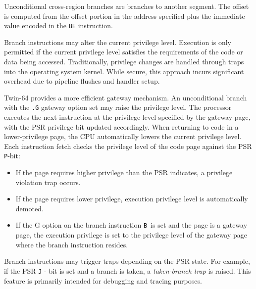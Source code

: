 
Unconditional cross-region branches are branches to another segment. The offset is computed from the offset portion in the address specified plus the immediate value encoded in the \texttt{BE} instruction.


Branch instructions may alter the current privilege level. Execution is only permitted if the current privilege level satisfies the requirements of the code or data being accessed. Traditionally, privilege changes are handled through traps into the operating system kernel. While secure, this approach incurs significant overhead due to pipeline flushes and handler setup.

Twin-64 provides a more efficient gateway mechanism. An unconditional branch with the \texttt{.G} gateway option set may raise the privilege level. The processor executes the next instruction at the privilege level specified by the gateway page, with the PSR privilege bit updated accordingly. When returning to code in a lower-privilege page, the CPU automatically lowers the current privilege level. Each instruction fetch checks the privilege level of the code page against the PSR \texttt{P}-bit:

\begin{itemize}
\setlength{\itemsep}{0.5em}
\setlength{\parskip}{0pt}
\item If the page requires higher privilege than the PSR indicates, a privilege violation trap occurs.
\item If the page requires lower privilege, execution privilege level is automatically demoted.
\item If the G option on the branch instruction \texttt{B}\ is set and the page is a gateway page, the execution privilege is set to the privilege level of the gateway page where the branch instruction resides.
\end{itemize}


Branch instructions may trigger traps depending on the PSR state. For example, if the PSR \texttt{J} - bit is set and a branch is taken, a \textit{taken-branch trap} is raised. This feature is primarily intended for debugging and tracing purposes.
